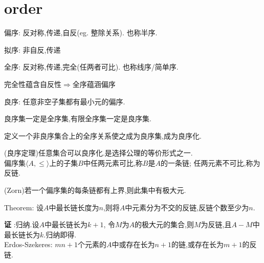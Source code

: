 \section{order}
偏序:
反对称,传递,自反(eg. 整除关系).
也称半序.

拟序:
非自反,传递

全序:
反对称,传递,完全(任两者可比).
也称线序/简单序.

完全性蕴含自反性$ \Rightarrow $全序蕴涵偏序

良序:
任意非空子集都有最小元的偏序.

良序集一定是全序集,有限全序集一定是良序集.

定义一个非良序集合上的全序关系使之成为良序集,成为良序化.

(良序定理)任意集合可以良序化.是选择公理的等价形式之一.
\\

偏序集$ \langle A,\le \rangle$上的子集$ B$中任两元素可比,称$ B$是$ A$的一条链;
任两元素不可比,称为反链.

(Zorn)若一个偏序集的每条链都有上界,则此集中有极大元.

Theorem:
设$ A$中最长链长度为$ n$,则将$ A$中元素分为不交的反链,反链个数至少为$ n$.

{\bf 证 }:归纳.设$ A$中最长链长为$ k+1$,
令$ M$为$ A$的极大元的集合,则$ M$为反链,且$ A-M$中最长链长为$ k$.归纳即得.
\\

Erdos-Szekeres:
$ mn+1$个元素的$ A$中或存在长为$ n+1$的链,或存在长为$ m+1$的反链.


